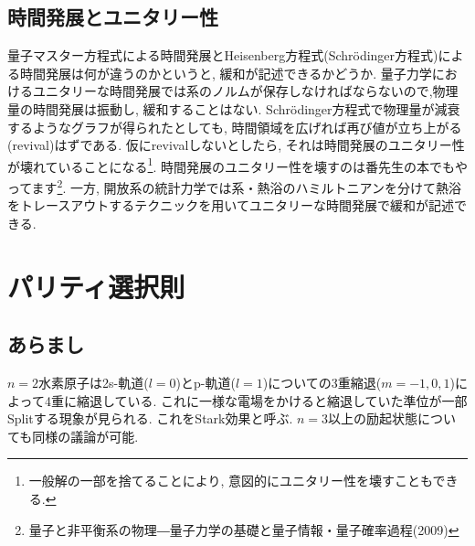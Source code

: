 \documentclass[10.5pt,a4paper]{jreport}
\begin{document}
\subsection{時間発展とユニタリー性}
量子マスター方程式による時間発展とHeisenberg方程式(Schr\"odinger方程式)による時間発展は何が違うのかというと, 緩和が記述できるかどうか. 量子力学におけるユニタリーな時間発展では系のノルムが保存しなければならないので,物理量の時間発展は振動し, 緩和することはない. Schr\"odinger方程式で物理量が減衰するようなグラフが得られたとしても, 時間領域を広げれば再び値が立ち上がる(revival)はずである. 仮にrevivalしないとしたら, それは時間発展のユニタリー性が壊れていることになる\footnote{一般解の一部を捨てることにより, 意図的にユニタリー性を壊すこともできる.}. 時間発展のユニタリー性を壊すのは番先生の本でもやってます\footnote{量子と非平衡系の物理―量子力学の基礎と量子情報・量子確率過程(2009)}. 一方, 開放系の統計力学では系・熱浴のハミルトニアンを分けて熱浴をトレースアウトするテクニックを用いてユニタリーな時間発展で緩和が記述できる.

\section{パリティ選択則}
\subsection{あらまし}
$n=2$水素原子は2s-軌道($l=0$)とp-軌道($l=1$)についての3重縮退($m=-1,0,1$)によって4重に縮退している. これに一様な電場をかけると縮退していた準位が一部Splitする現象が見られる. これをStark効果と呼ぶ. $n=3$以上の励起状態についても同様の議論が可能.
\end{document}
